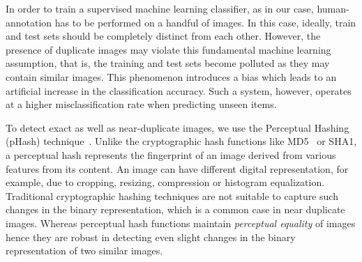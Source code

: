 \documentclass{iscram}
\begin{document}
In order to train a supervised machine learning classifier, as in our case, human-annotation has to be performed on a handful of images. In this case, ideally, train and test sets should be completely distinct from each other. However, the presence of duplicate images may violate this fundamental machine learning assumption, that is, the training and test sets become polluted as they may contain similar images. This phenomenon introduces a bias which leads to an artificial increase in the classification accuracy. Such a system, however, operates at a higher misclassification rate when predicting unseen items.


To detect exact as well as near-duplicate images, we use the Perceptual Hashing (pHash) technique~\parencite{lei2011robust, zauner2010implementation}. Unlike the cryptographic hash functions like MD5~\parencite{rivest1992md5} or SHA1, a perceptual hash represents the fingerprint of an image derived from various features from its content. An image can have different digital representation, for example, due to cropping, resizing, compression or histogram equalization. Traditional cryptographic hashing techniques are not suitable to capture such changes in the binary representation, which is a common case in near duplicate images. Whereas perceptual hash functions maintain \emph{perceptual equality} of images hence they are robust in detecting even slight changes in the binary representation of two similar images.
\end{document}
